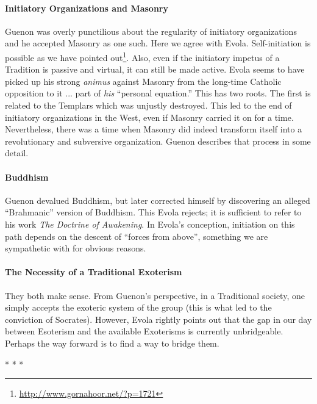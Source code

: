 \paragraph{Initiatory Organizations and Masonry}


Guenon was overly punctilious about the regularity of initiatory organizations and he accepted Masonry as one such. Here we agree with Evola. Self-initiation is possible as we have pointed out\footnote{\url{http://www.gornahoor.net/?p=1721}}. Also, even if the initiatory impetus of a Tradition is passive and virtual, it can still be made active. Evola seems to have picked up his strong \emph{animus} against Masonry from the long-time Catholic opposition to it ... part of \emph{his} ``personal equation.'' This has two roots. The first is related to the Templars which was unjustly destroyed. This led to the end of initiatory organizations in the West, even if Masonry carried it on for a time. Nevertheless, there was a time when Masonry did indeed transform itself into a revolutionary and subversive organization. Guenon describes that process in some detail.

\paragraph{Buddhism}


Guenon devalued Buddhism, but later corrected himself by discovering an alleged ``Brahmanic'' version of Buddhism. This Evola rejects; it is sufficient to refer to his work \emph{The Doctrine of Awakening}. In Evola's conception, initiation on this path depends on the descent of ``forces from above'', something we are sympathetic with for obvious reasons.

\paragraph{The Necessity of a Traditional Exoterism}


They both make sense. From Guenon's perspective, in a Traditional society, one simply accepts the exoteric system of the group (this is what led to the conviction of Socrates). However, Evola rightly points out that the gap in our day between Esoterism and the available Exoterisms is currently unbridgeable. Perhaps the way forward is to find a way to bridge them.



\begin{center}* * *\end{center}

